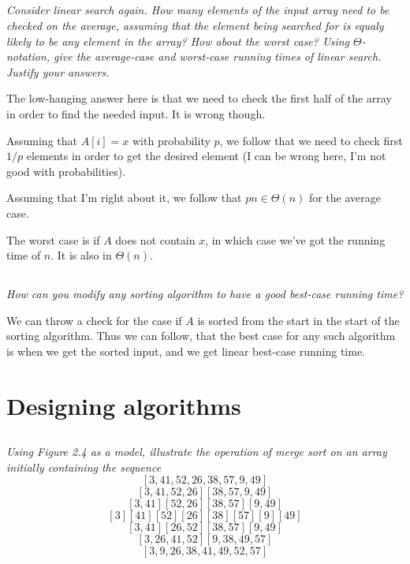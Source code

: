 \documentclass[11pt,oneside,titlepage]{book}
\begin{document}
\subsection{}

\textit{Consider linear search again. How many elements of the input array need to be checked on
  the average, assuming that the element being searched for is equaly likely to be any element
  in the array? How about the worst case? Using $\Theta$-notation, give the average-case and
  worst-case running times of linear search. Justify your answers.}

The low-hanging answer here is that we need to check the first half of the array in order to
find the needed input. It is wrong though.

Assuming that $A[i] = x$ with probability $p$, we follow that we need to check first
$1/p$ elements in order to get the desired element (I can be wrong here, I'm not good with
probabilities).

Assuming that I'm right about it, we follow that $pn \in \Theta(n)$ for the average case.

The worst case is if $A$ does not contain $x$, in which case we've got the
running time of $n$. It is also in $\Theta(n)$.

\subsection{}

\textit{How can you modify any sorting algorithm to have a good best-case running time?}

We can throw a check for the case if $A$ is sorted from the start in the start of the
sorting algorithm. Thus we can follow, that the best case for any such algorithm is
when we get the sorted input, and we get linear best-case running time.

\section{Designing algorithms}

\subsection{}

\textit{Using Figure 2.4 as a model, illustrate the operation of merge sort on an array
  initially containing the sequence }
$$[3, 41, 52, 26, 38, 57, 9, 49]$$
$$[3, 41, 52, 26] [ 38, 57, 9, 49]$$
$$[3, 41] [52, 26] [38, 57] [9, 49]$$
$$[3] [41] [52] [26] [38] [57] [9] [49]$$
$$[3, 41] [26, 52] [38, 57] [9, 49]$$
$$[3, 26, 41,  52] [9, 38, 49, 57]$$
$$[3, 9, 26, 38, 41, 49, 52, 57]$$
\end{document}
